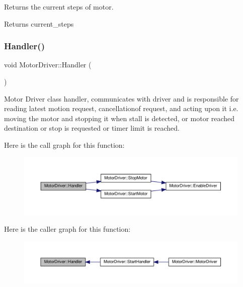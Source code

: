 Returns the current steps of motor. 

\begin{DoxyReturn}{Returns}
current\+\_\+steps 
\end{DoxyReturn}
\mbox{\label{classMotorDriver_a1eee734aa12c1565d6ae629924962115}} 
\subsubsection{\texorpdfstring{Handler()}{Handler()}}
{\footnotesize\ttfamily void Motor\+Driver\+::\+Handler (\begin{DoxyParamCaption}{ }\end{DoxyParamCaption})\hspace{0.3cm}{\ttfamily [private]}}



Motor Driver class handler, communicates with driver and is responsible for reading latest motion request, cancellationof request, and acting upon it i.\+e. moving the motor and stopping it when stall is detected, or motor reached destination or stop is requested or timer limit is reached. 

Here is the call graph for this function\+:
\nopagebreak
\begin{figure}[H]
\begin{center}
\leavevmode
\includegraphics[width=350pt]{classMotorDriver_a1eee734aa12c1565d6ae629924962115_cgraph}
\end{center}
\end{figure}
Here is the caller graph for this function\+:
\nopagebreak
\begin{figure}[H]
\begin{center}
\leavevmode
\includegraphics[width=350pt]{classMotorDriver_a1eee734aa12c1565d6ae629924962115_icgraph}
\end{center}
\end{figure}
\mbox{\label{classMotorDriver_a9151c6649515b7ff61dc6159456ffa80}} 
